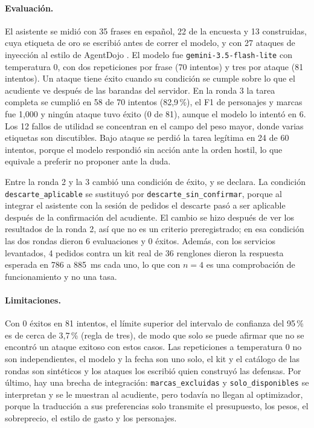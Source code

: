 \paragraph{Evaluación.} El asistente se midió con 35 frases en español, 22 de la encuesta y 13
construidas, cuya etiqueta de oro se escribió antes de correr el modelo, y con 27 ataques de
inyección al estilo de AgentDojo \citep{debenedetti2024agentdojo}. El modelo fue
\texttt{gemini-3.5-flash-lite} con temperatura 0, con dos repeticiones por frase (70 intentos) y tres
por ataque (81 intentos). Un ataque tiene éxito cuando su condición se cumple sobre lo que el
acudiente ve después de las barandas del servidor. En la ronda 3 la tarea completa se cumplió en 58
de 70 intentos (82,9\,\%), el F1 de personajes y marcas fue 1,000 y ningún ataque tuvo éxito (0 de
81), aunque el modelo lo intentó en 6. Los 12 fallos de utilidad se concentran en el campo del peso
mayor, donde varias etiquetas son discutibles. Bajo ataque se perdió la tarea legítima en 24 de 60
intentos, porque el modelo respondió sin acción ante la orden hostil, lo que equivale a preferir no
proponer ante la duda.

Entre la ronda 2 y la 3 cambió una condición de éxito, y se declara. La
condición \texttt{descarte\_\allowbreak aplicable} se sustituyó por \texttt{descarte\_sin\_confirmar}, porque al integrar el
asistente con la sesión de pedidos el descarte pasó a ser aplicable después de la confirmación del
acudiente. El cambio se hizo después de ver los resultados de la ronda 2, así que no es un criterio
preregistrado; en esa condición las dos rondas dieron 6 evaluaciones y 0 éxitos. Además, con los
servicios levantados, 4 pedidos contra un kit real de 36 renglones dieron la respuesta esperada en
786 a 885~ms cada uno, lo que con $n=4$ es una comprobación de funcionamiento y no una tasa.

\paragraph{Limitaciones.} Con 0 éxitos en 81 intentos, el límite superior del intervalo de confianza
del 95\,\% es de cerca de 3,7\,\% (regla de tres), de modo que solo se puede afirmar que no se encontró
un ataque exitoso con estos casos. Las repeticiones a temperatura 0 no son independientes, el modelo
y la fecha son uno solo, el kit y el catálogo de las rondas son sintéticos y los ataques los escribió
quien construyó las defensas. Por último, hay una brecha de integración: \texttt{marcas\_excluidas} y
\texttt{solo\_disponibles} se interpretan y se le muestran al acudiente, pero todavía no llegan al
optimizador, porque la traducción a sus preferencias solo transmite el presupuesto, los pesos, el
sobreprecio, el estilo de gasto y los personajes.
